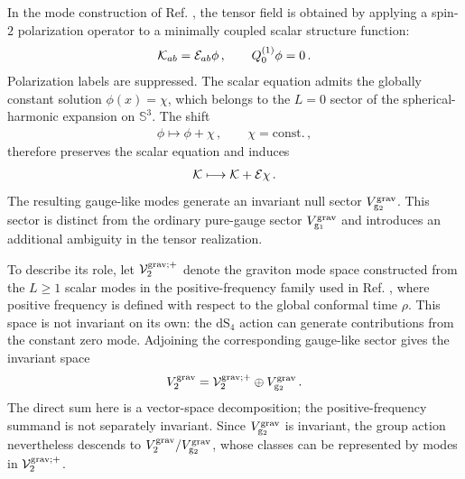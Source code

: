 \documentclass{SciPost}
\begin{document}
In the mode construction of Ref. \cite{GravGB}, the tensor field is obtained by applying a spin-$2$ polarization operator to a minimally coupled scalar structure function:
\begin{align}\label{eq:graviton-scalar-structure}
    {\cal K}_{ab}={\cal E}_{ab}\phi \,,
    \qquad
    Q^{(1)}_0\phi=0 \,.
\end{align}
Polarization labels are suppressed. The scalar equation admits the globally constant solution $\phi(x)=\chi$, which belongs to the $L=0$ sector of the spherical-harmonic expansion on $\mathbb S^3$. The shift
\begin{align}
    \phi\longmapsto\phi+\chi \,,
    \qquad
    \chi=\mathrm{const.} \,,
\end{align}
therefore preserves the scalar equation and induces
\begin{align}\label{eq:graviton-gauge-like}
    {\cal K}\longmapsto{\cal K}+{\cal E}\chi \,.
\end{align}
The resulting gauge-like modes generate an invariant null sector $V_{{\rm g}_2}^{\rm grav}$. This sector is distinct from the ordinary pure-gauge sector $V_{{\rm g}_1}^{\rm grav}$ and introduces an additional ambiguity in the tensor realization.

To describe its role, let ${\cal V}_2^{\rm grav;+}$ denote the graviton mode space constructed from the $L\geqslant1$ scalar modes in the positive-frequency family used in Ref. \cite{GravGB}, where positive frequency is defined with respect to the global conformal time $\rho$. This space is not invariant on its own: the $\mathrm{dS}_{4}$ action can generate contributions from the constant zero mode. Adjoining the corresponding gauge-like sector gives the invariant space
\begin{align}
    V_2^{\rm grav}
    =
    {\cal V}_2^{\rm grav;+}
    \oplus V_{{\rm g}_2}^{\rm grav} \,.
\end{align}
The direct sum here is a vector-space decomposition; the positive-frequency summand is not separately invariant. Since $V_{{\rm g}_2}^{\rm grav}$ is invariant, the group action nevertheless descends to $V_2^{\rm grav}/V_{{\rm g}_2}^{\rm grav}$, whose classes can be represented by modes in ${\cal V}_2^{\rm grav;+}$.
\end{document}
